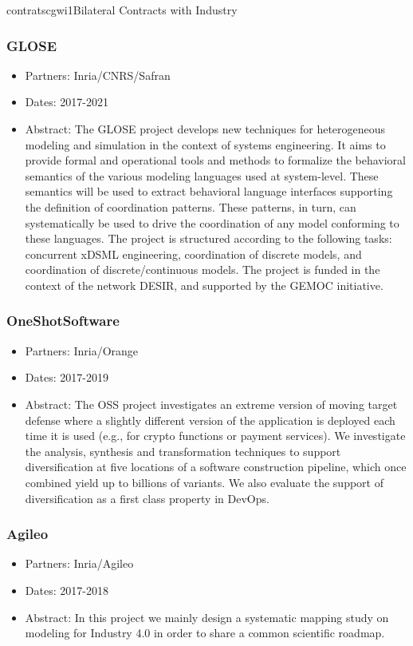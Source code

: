 \documentclass{ra2018}
\begin{document}
\begin{module}{contrats}{cgwi1}{Bilateral Contracts with Industry}
\subsubsection*{GLOSE}
\begin{itemize}
	\item Partners: Inria/CNRS/Safran
	\item Dates: 2017-2021
	\item Abstract: The GLOSE project develops new techniques for heterogeneous modeling and simulation in the context of systems engineering. It aims to provide formal and operational tools and methods to formalize the behavioral semantics of the various modeling languages used at system-level. These semantics will be used to extract behavioral language interfaces supporting the definition of coordination patterns. These patterns, in turn, can systematically be used to drive the coordination of any model conforming to these languages. The project is structured according to the following tasks: concurrent xDSML engineering, coordination of discrete models, and coordination of discrete/continuous models. The project is funded in the context of the network DESIR, and supported by the GEMOC initiative.
\end{itemize}

\subsubsection*{OneShotSoftware}
\begin{itemize}
	\item Partners: Inria/Orange
	\item Dates: 2017-2019
	\item Abstract: The OSS project investigates an extreme version of moving target defense where a slightly different version of the application is deployed each time it is used (e.g., for crypto functions or payment services). We investigate the analysis, synthesis and transformation techniques to support diversification at five locations of a software construction pipeline, which once combined yield up to billions of variants. We also evaluate the support of diversification as a first class property in DevOps.
\end{itemize}


\subsubsection*{Agileo}
\begin{itemize}
	\item Partners: Inria/Agileo
	\item Dates: 2017-2018
	\item Abstract: In this project we mainly design a systematic mapping study on modeling for Industry 4.0 in order to share a common scientific roadmap. 
\end{itemize}

\end{module}
\end{document}
